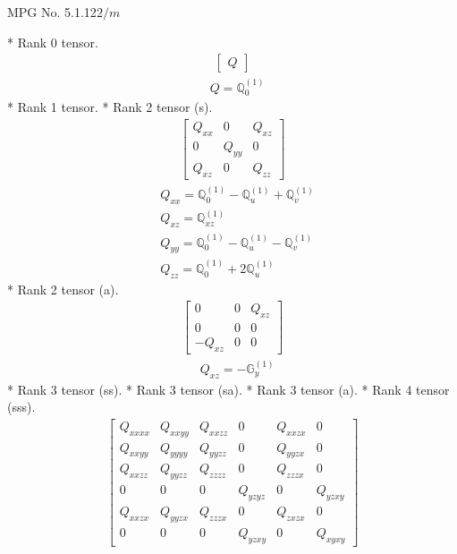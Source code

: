 \documentclass[fleqn,8pt,landscape]{jsarticle}
\begin{document}
\setcounter{MaxMatrixCols}{32}

\renewcommand{\tablename}{Table~}
\renewcommand{\figurename}{Figure~}
\begin{center}
\LARGE
MPG No. 5.1.12\quad$2/m$
\end{center}
* Rank 0 tensor.
\begin{align*}
\begin{bmatrix} Q \end{bmatrix}
\end{align*}
\begin{align*}
& Q = \mathbb{Q}_{0}^{(1)}
\end{align*}
* Rank 1 tensor.
* Rank 2 tensor (s).
\begin{align*}
\begin{bmatrix} Q_{xx} & 0 & Q_{xz} \\ 0 & Q_{yy} & 0 \\ Q_{xz} & 0 & Q_{zz} \end{bmatrix}
\end{align*}
\begin{align*}
& Q_{xx} = \mathbb{Q}_{0}^{(1)} - \mathbb{Q}_{u}^{(1)} + \mathbb{Q}_{v}^{(1)} \\
& Q_{xz} = \mathbb{Q}_{xz}^{(1)} \\
& Q_{yy} = \mathbb{Q}_{0}^{(1)} - \mathbb{Q}_{u}^{(1)} - \mathbb{Q}_{v}^{(1)} \\
& Q_{zz} = \mathbb{Q}_{0}^{(1)} + 2 \mathbb{Q}_{u}^{(1)}
\end{align*}
* Rank 2 tensor (a).
\begin{align*}
\begin{bmatrix} 0 & 0 & Q_{xz} \\ 0 & 0 & 0 \\ - Q_{xz} & 0 & 0 \end{bmatrix}
\end{align*}
\begin{align*}
& Q_{xz} = - \mathbb{G}_{y}^{(1)}
\end{align*}
* Rank 3 tensor (ss).
* Rank 3 tensor (sa).
* Rank 3 tensor (a).
* Rank 4 tensor (sss).
\begin{align*}
\begin{bmatrix} Q_{xxxx} & Q_{xxyy} & Q_{xxzz} & 0 & Q_{xxzx} & 0 \\ Q_{xxyy} & Q_{yyyy} & Q_{yyzz} & 0 & Q_{yyzx} & 0 \\ Q_{xxzz} & Q_{yyzz} & Q_{zzzz} & 0 & Q_{zzzx} & 0 \\ 0 & 0 & 0 & Q_{yzyz} & 0 & Q_{yzxy} \\ Q_{xxzx} & Q_{yyzx} & Q_{zzzx} & 0 & Q_{zxzx} & 0 \\ 0 & 0 & 0 & Q_{yzxy} & 0 & Q_{xyxy} \end{bmatrix}
\end{align*}
\end{document}
